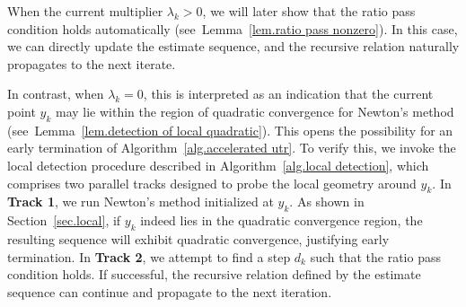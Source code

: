 \documentclass{mcom-l}
\numberwithin{equation}{section}
\begin{document}
\begin{algorithm}[!ht]
    \caption{Local Detection for Algorithm~\ref{alg.accelerated utr}}\label{alg.local detection}
    \begin{algorithmic}[1]
        \ENDIF
        \ENDIF
        \ENDFOR
        \ELSE
        \ENDIF
        \ELSE
        \ENDIF
        \ENDWHILE
    \end{algorithmic}
\end{algorithm}
When the current multiplier $\lambda_k > 0$, we will later show that the ratio pass condition holds automatically (see~Lemma~\ref{lem.ratio pass nonzero}). In this case, we can directly update the estimate sequence, and the recursive relation naturally propagates to the next iterate.

In contrast, when $\lambda_k = 0$, this is interpreted as an indication that the current point $y_k$ may lie within the region of quadratic convergence for Newton's method (see~Lemma~\ref{lem.detection of local quadratic}). This opens the possibility for an early termination of Algorithm~\ref{alg.accelerated utr}. To verify this, we invoke the local detection procedure described in Algorithm~\ref{alg.local detection}, which comprises two parallel tracks designed to probe the local geometry around $y_k$. In \textbf{Track 1}, we run Newton’s method initialized at $y_k$. As shown in Section~\ref{sec.local}, if $y_k$ indeed lies in the quadratic convergence region, the resulting sequence will exhibit quadratic convergence, justifying early termination. In \textbf{Track 2}, we attempt to find a step $d_k$ such that the ratio pass condition holds. If successful, the recursive relation defined by the estimate sequence can continue and propagate to the next iteration.
\end{document}
